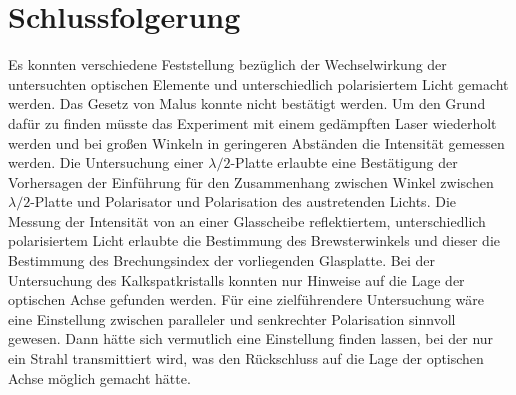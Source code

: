 \documentclass[
	a4paper,
	12pt,
	pagesize,
	ngerman
]{scrartcl}
\begin{document}
	\section{Schlussfolgerung} %
	Es konnten verschiedene Feststellung bezüglich der Wechselwirkung der untersuchten optischen Elemente und unterschiedlich polarisiertem Licht gemacht werden.
	Das Gesetz von Malus konnte nicht bestätigt werden.
	Um den Grund dafür zu finden müsste das Experiment mit einem gedämpften Laser wiederholt werden und bei großen Winkeln in geringeren Abständen die Intensität gemessen werden.
	Die Untersuchung einer $\lambda/2$-Platte erlaubte eine Bestätigung der Vorhersagen der Einführung für den Zusammenhang zwischen Winkel zwischen $\lambda/2$-Platte und Polarisator und Polarisation des austretenden Lichts.
	Die Messung der Intensität von an einer Glasscheibe reflektiertem, unterschiedlich polarisiertem Licht erlaubte die Bestimmung des Brewsterwinkels und dieser die Bestimmung des Brechungsindex der vorliegenden Glasplatte.
	Bei der Untersuchung des Kalkspatkristalls konnten nur Hinweise auf die Lage der optischen Achse gefunden werden.
	Für eine zielführendere Untersuchung wäre eine Einstellung zwischen paralleler und senkrechter Polarisation sinnvoll gewesen.
	Dann hätte sich vermutlich eine Einstellung finden lassen, bei der nur ein Strahl transmittiert wird, was den Rückschluss auf die Lage der optischen Achse möglich gemacht hätte.
	
	\printbibliography
\end{document}
